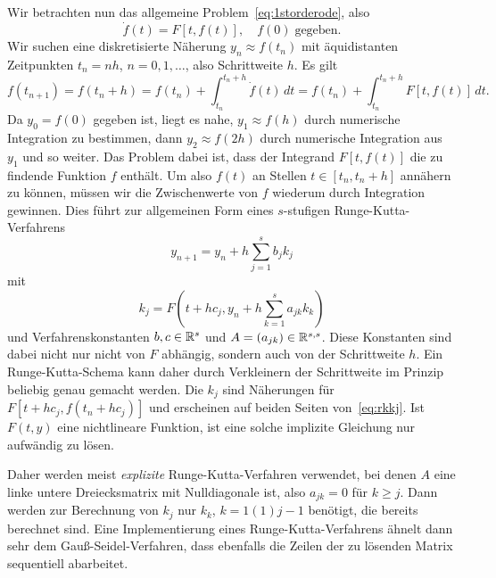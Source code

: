 \subsection{}

Wir betrachten nun das allgemeine Problem~\eqref{eq:1storderode}, also
\begin{equation*}
  \dot f(t) = F[t, f(t)],\quad f(0)\;\text{gegeben}.
\end{equation*}
Wir suchen eine diskretisierte Näherung $y_n \approx f(t_n)$ mit
äquidistanten Zeitpunkten $t_n=n h$, $n=0,1,\ldots$, also Schrittweite
$h$. Es gilt
\begin{equation}
  f(t_{n+1}) = f(t_n+h) = f(t_n) + \int_{t_n}^{t_n+h} \dot f(t)\,dt
  =  f(t_n) + \int_{t_n}^{t_n+h} F[t, f(t)]\,dt.
\end{equation}
Da $y_0 = f(0)$ gegeben ist, liegt es nahe, $y_1 \approx f(h)$ durch
numerische Integration zu bestimmen, dann $y_2 \approx f(2h)$ durch
numerische Integration aus $y_1$ und so weiter. Das Problem dabei ist,
dass der Integrand $F[t, f(t)]$ die zu findende Funktion $f$
enthält. Um also $f(t)$ an Stellen $t\in [t_n, t_n + h]$ annähern zu
können, müssen wir die Zwischenwerte von $f$ wiederum durch
Integration gewinnen. Dies führt zur allgemeinen Form eines
$s$-stufigen Runge-Kutta-Verfahrens
\begin{equation}
  y_{n+1} = y_n + h\sum_{j=1}^s b_j k_j
\end{equation}
mit
\begin{equation}
  \label{eq:rkkj}
  k_j = F(t + h c_j, y_n + h \sum_{k=1}^s a_{jk} k_k)
\end{equation}
und Verfahrenskonstanten $b,c\in\mathbb{R}^s$ und
$A=(a_{jk})\in\mathbb{R}^{s,s}$. Diese Konstanten sind dabei nicht nur nicht
von $F$ abhängig, sondern auch von der Schrittweite $h$. Ein
Runge-Kutta-Schema kann daher durch Verkleinern der Schrittweite im
Prinzip beliebig genau gemacht werden.  Die $k_j$ sind Näherungen für
$F[t + h c_j, f(t_n + h c_j)]$ und erscheinen auf beiden Seiten
von~\eqref{eq:rkkj}.  Ist $F(t,y)$ eine nichtlineare Funktion, ist
eine solche implizite Gleichung nur aufwändig zu lösen.

%
Daher werden meist \emph{explizite} Runge-Kutta-Verfahren verwendet,
bei denen $A$ eine linke untere Dreiecksmatrix mit Nulldiagonale ist,
also $a_{jk} = 0$ für $k\ge j$. Dann werden zur Berechnung von $k_j$
nur $k_k$, $k=1(1)j-1$ benötigt, die bereits berechnet sind. Eine
Implementierung eines Runge-Kutta-Verfahrens ähnelt dann sehr dem
Gauß-Seidel-Verfahren, dass ebenfalls die Zeilen der zu lösenden
Matrix sequentiell abarbeitet.

